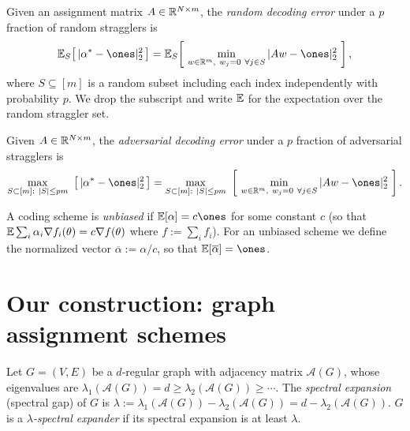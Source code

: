 \begin{definition}
  \label{def:random-error}
  Given an assignment matrix $A \in \mathbb{R}^{N \times m}$, the \emph{random decoding
  error} under a $p$ fraction of random stragglers is
  \[
    \E_S\!\left[\,|\alpha^* - \ones|_2^2\,\right]
      = \E_S\!\left[\ \min_{w \in \R^m,\ w_j = 0\ \forall j \in S} |Aw - \ones|_2^2\ \right],
  \]
  where $S \subseteq [m]$ is a random subset including each index independently
  with probability $p$. We drop the subscript and write $\mathbb{E}$ for the expectation
  over the random straggler set.
\end{definition}

\begin{definition}
  \label{def:adversarial-error}
  Given $A \in \mathbb{R}^{N \times m}$, the \emph{adversarial decoding error} under a
  $p$ fraction of adversarial stragglers is
  \[
    \max_{S \subset [m] :\ |S| \le pm}\ \big[\,|\alpha^* - \ones|_2^2\,\big]
      = \max_{S \subset [m] :\ |S| \le pm}
        \ \left[\ \min_{w \in \R^m,\ w_j = 0\ \forall j \in S} |Aw - \ones|_2^2\ \right].
  \]
\end{definition}

\begin{definition}
  \label{def:unbiased}
  A coding scheme is \emph{unbiased} if $\E[\alpha] = c\ones$ for some constant
  $c$ (so that $\mathbb{E}\sum_i \alpha_i \nabla f_i(\theta) = c\nabla f(\theta)$ where
  $f := \sum_i f_i$). For an unbiased scheme we define the normalized vector
  $\overline{\alpha} := \alpha/c$, so that $\E[\overline{\alpha}] = \ones$.
\end{definition}

\chapter{Our construction: graph assignment schemes}

\begin{definition}
  \label{def:spectral-expander}
  Let $G = (V,E)$ be a $d$-regular graph with adjacency matrix
  $\mathcal{A}(G)$, whose eigenvalues are
  $\lambda_1(\mathcal{A}(G)) = d \ge \lambda_2(\mathcal{A}(G)) \ge \cdots$. The
  \emph{spectral expansion} (spectral gap) of $G$ is
  $\lambda := \lambda_1(\mathcal{A}(G)) - \lambda_2(\mathcal{A}(G))
   = d - \lambda_2(\mathcal{A}(G))$.
  $G$ is a \emph{$\lambda$-spectral expander} if its spectral expansion is at
  least $\lambda$.
\end{definition}

